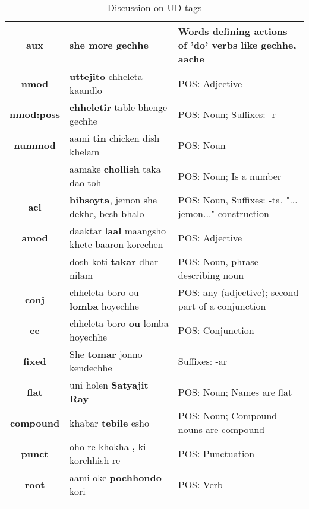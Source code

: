 \documentclass[a4 paper]{article}
\begin{document}
\begin{longtable}{cp{}p{}}
    \textbf{aux}
                 & she \textbf{more} gechhe & Words defining actions of 'do' verbs like gechhe, aache\\
    \midrule
    \textbf{nmod}
                 & \textbf{uttejito} chheleta kaandlo & POS: Adjective\\
    \midrule
    \addlinespace[0.5em]
    \textbf{nmod:poss}
                 & \textbf{chheletir} table bhenge gechhe & POS: Noun; Suffixes: -r\\
    \midrule
    \textbf{nummod}
                 & aami \textbf{tin} chicken dish khelam & POS: Noun\\
    \addlinespace[0.5em]
                 & aamake \textbf{chollish} taka dao toh & POS: Noun; Is a number\\
    \midrule
    \textbf{acl}
                 & \textbf{bihsoyta}, jemon she dekhe, besh bhalo & POS: Noun, Suffixes: -ta, 
                 "... jemon..." construction\\
    \midrule
    \textbf{amod}
                 & daaktar \textbf{laal} maangsho khete baaron korechen 
                 & POS: Adjective\\
    \addlinespace[0.5em]
                 & dosh koti \textbf{takar} dhar nilam & POS: Noun, phrase describing noun\\
    \midrule
    \textbf{conj}
                 & chheleta boro ou \textbf{lomba} hoyechhe 
                 & POS: any (adjective); second part of a conjunction\\
    \midrule
    \textbf{cc}
                 & chheleta boro \textbf{ou} lomba hoyechhe 
                 & POS: Conjunction\\
    \midrule
    \textbf{fixed}
                 & She \textbf{tomar} jonno kendechhe & Suffixes: -ar\\
    \midrule
    \textbf{flat}
                 & uni holen \textbf{Satyajit Ray} & POS: Noun; Names are flat\\
    \midrule
    \textbf{compound}
                 & khabar \textbf{tebile} esho & POS: Noun; Compound nouns are compound\\
    \midrule
    \textbf{punct}
                 & oho re khokha \textbf{,} ki korchhish re & POS: Punctuation\\
    \midrule
    \textbf{root}
                 & aami oke \textbf{pochhondo} kori & POS: Verb\\
    \bottomrule
    
\caption{Discussion on UD tags}
\label{tab:udtable}
\end{longtable}
\end{document}
